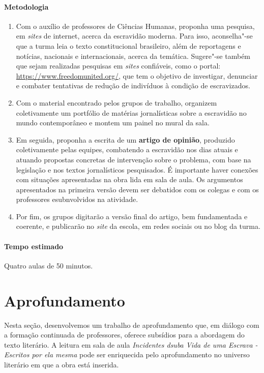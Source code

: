 \documentclass[11pt]{extarticle}
\begin{document}
 \paragraph{Metodologia}
   \begin{enumerate}
    \item
    Com o
auxílio de professores de Ciências Humanas, proponha uma pesquisa, em
\emph{sites} de internet, acerca da escravidão moderna. Para isso,
aconselha"-se que a turma leia o texto constitucional brasileiro, além de
reportagens e notícias, nacionais e internacionais, acerca da temática.
Sugere"-se também que sejam realizadas pesquisas em \emph{sites}
confiáveis, como o portal: \url{https://www.freedomunited.org/}, que tem
o objetivo de investigar, denunciar e combater tentativas de redução de
indivíduos à condição de escravizados.


    \item
    Com o material encontrado pelos
grupos de trabalho, organizem coletivamente um portfólio de matérias
jornalísticas sobre a escravidão no mundo contemporâneo e montem um
painel no mural da sala.
    \item
    Em seguida, proponha a escrita de um
\textbf{artigo de opinião}, produzido coletivamente pelas equipes,
combatendo a escravidão nos dias atuais e atuando propostas concretas de
intervenção sobre o problema, com base na legislação e nos textos
jornalísticos pesquisados. É importante haver conexões com situações
apresentadas na obra lida em sala de aula. Os argumentos apresentados na
primeira versão devem ser debatidos com os colegas e com os professores
esubnvolvidos na atividade.


  \item
  Por fim, os grupos digitarão a versão final do
artigo, bem fundamentada e coerente, e publicarão no \emph{site} da
escola, em redes sociais ou no blog da turma.
   \end{enumerate}


 \paragraph{Tempo estimado} Quatro aulas de 50 minutos.


\section{Aprofundamento}

Nesta seção, desenvolvemos um trabalho de aprofundamento que, em diálogo
com a formação continuada de professores, oferece subsídios para a
abordagem do texto literário. A leitura em sala de aula \emph{Incidentes
dsuba Vida de uma Escrava - Escritos por ela mesma} pode ser enriquecida
pelo aprofundamento no universo literário em que a obra está inserida.
\end{document}
